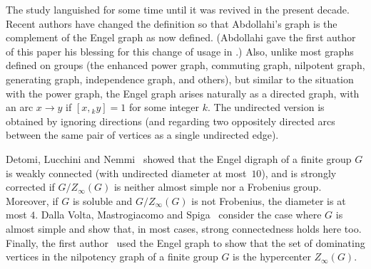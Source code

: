 \documentclass[reqno,12pt]{amsart}
\theoremstyle{plain}
\theoremstyle{definition}
\begin{document}
The study languished for some time until it was revived in the present decade.
Recent authors have changed the definition so that Abdollahi's graph is the
complement of the Engel graph as now defined. (Abdollahi gave the first author
of this paper his blessing for this change of usage in \cite{Cameron2022}.)
Also, unlike most graphs defined on groups (the enhanced power graph, commuting
graph, nilpotent graph, generating graph, independence graph, and others), but
similar to the situation with the power graph, the Engel graph arises naturally
as a directed graph, with an arc $x\to y$ if $[x,{}_ky]=1$ for some integer $k$.
The undirected version is obtained by ignoring directions (and regarding two
oppositely directed arcs between the same pair of vertices as a single
undirected edge).

Detomi, Lucchini and Nemmi~\cite{DLN} showed that the Engel digraph of a finite
group $G$ is weakly connected (with undirected diameter at most~$10$), and is
strongly corrected if $G/Z_\infty(G)$ is neither almost simple nor a Frobenius
group. Moreover, if $G$ is soluble and $G/Z_\infty(G)$ is not Frobenius, the
diameter is at most $4$. Dalla Volta, Mastrogiacomo and Spiga~\cite{DVMS}
consider the case where $G$ is almost simple and show that, in most cases,
strong connectedness holds here too. Finally, the first
author~\cite{Cameron2022} used the Engel graph to show that the set of
dominating vertices in the nilpotency graph of a finite group $G$ is the
hypercenter $Z_\infty(G)$.

\end{document}
